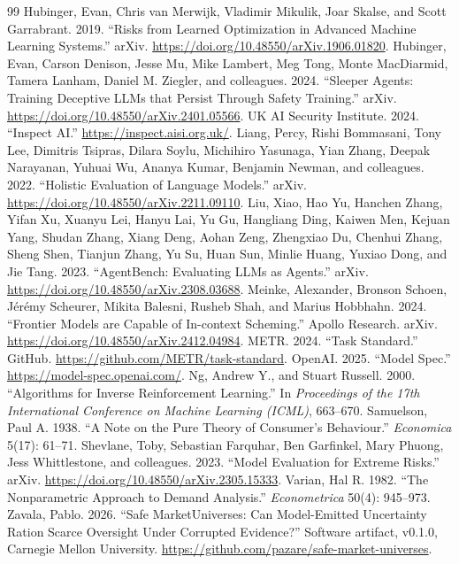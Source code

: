 \documentclass[11pt]{article}
\begin{document}
\begin{thebibliography}{99}
 Hubinger, Evan, Chris van Merwijk, Vladimir Mikulik, Joar Skalse, and Scott Garrabrant. 2019. ``Risks from Learned Optimization in Advanced Machine Learning Systems.'' arXiv. \url{https://doi.org/10.48550/arXiv.1906.01820}.
 Hubinger, Evan, Carson Denison, Jesse Mu, Mike Lambert, Meg Tong, Monte MacDiarmid, Tamera Lanham, Daniel M. Ziegler, and colleagues. 2024. ``Sleeper Agents: Training Deceptive LLMs that Persist Through Safety Training.'' arXiv. \url{https://doi.org/10.48550/arXiv.2401.05566}.
 UK AI Security Institute. 2024. ``Inspect AI.'' \url{https://inspect.aisi.org.uk/}.
 Liang, Percy, Rishi Bommasani, Tony Lee, Dimitris Tsipras, Dilara Soylu, Michihiro Yasunaga, Yian Zhang, Deepak Narayanan, Yuhuai Wu, Ananya Kumar, Benjamin Newman, and colleagues. 2022. ``Holistic Evaluation of Language Models.'' arXiv. \url{https://doi.org/10.48550/arXiv.2211.09110}.
 Liu, Xiao, Hao Yu, Hanchen Zhang, Yifan Xu, Xuanyu Lei, Hanyu Lai, Yu Gu, Hangliang Ding, Kaiwen Men, Kejuan Yang, Shudan Zhang, Xiang Deng, Aohan Zeng, Zhengxiao Du, Chenhui Zhang, Sheng Shen, Tianjun Zhang, Yu Su, Huan Sun, Minlie Huang, Yuxiao Dong, and Jie Tang. 2023. ``AgentBench: Evaluating LLMs as Agents.'' arXiv. \url{https://doi.org/10.48550/arXiv.2308.03688}.
 Meinke, Alexander, Bronson Schoen, J\'er\'emy Scheurer, Mikita Balesni, Rusheb Shah, and Marius Hobbhahn. 2024. ``Frontier Models are Capable of In-context Scheming.'' Apollo Research. arXiv. \url{https://doi.org/10.48550/arXiv.2412.04984}.
 METR. 2024. ``Task Standard.'' GitHub. \url{https://github.com/METR/task-standard}.
 OpenAI. 2025. ``Model Spec.'' \url{https://model-spec.openai.com/}.
 Ng, Andrew Y., and Stuart Russell. 2000. ``Algorithms for Inverse Reinforcement Learning.'' In \emph{Proceedings of the 17th International Conference on Machine Learning (ICML)}, 663--670.
 Samuelson, Paul A. 1938. ``A Note on the Pure Theory of Consumer's Behaviour.'' \emph{Economica} 5(17): 61--71.
 Shevlane, Toby, Sebastian Farquhar, Ben Garfinkel, Mary Phuong, Jess Whittlestone, and colleagues. 2023. ``Model Evaluation for Extreme Risks.'' arXiv. \url{https://doi.org/10.48550/arXiv.2305.15333}.
 Varian, Hal R. 1982. ``The Nonparametric Approach to Demand Analysis.'' \emph{Econometrica} 50(4): 945--973.
 Zavala, Pablo. 2026. ``Safe MarketUniverses: Can Model-Emitted Uncertainty Ration Scarce Oversight Under Corrupted Evidence?'' Software artifact, v0.1.0, Carnegie Mellon University. \url{https://github.com/pazare/safe-market-universes}.
\end{thebibliography}
\end{document}
